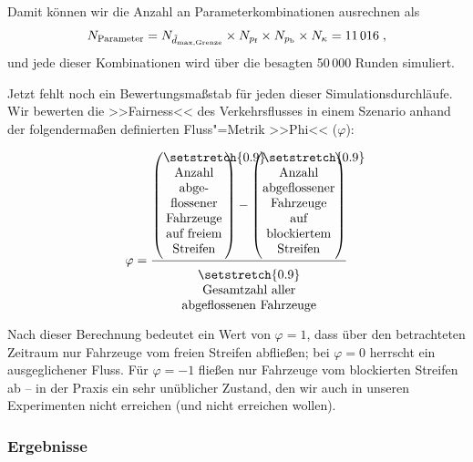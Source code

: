 Damit können wir die Anzahl an Parameterkombinationen ausrechnen als
\begin{equation}
N_{\text{Parameter}} = N_{\tilde{d}_{\text{max,Grenze}}} \times N_{p_{\text{f}}} \times N_{p_{\text{b}}} \times N_\kappa = 11\,016\;,
\end{equation}
und jede dieser Kombinationen wird über die besagten 50\,000 Runden simuliert.



Jetzt fehlt noch ein Bewertungsmaßstab für jeden dieser Simulationsdurchläufe. Wir bewerten die >>Fairness<< des Verkehrsflusses in einem Szenario anhand der folgendermaßen definierten Fluss"=Metrik >>Phi<< ($\varphi$):

\begin{equation}
\varphi = \frac{\left(\text{\parbox{1.7cm}{\centering\setstretch{0.9} Anzahl abgeflossener Fahrzeuge auf freiem Streifen\vspace{0.5em}}}\right) - \left(\text{\parbox{2cm}{\centering\setstretch{0.9} Anzahl abgeflossener Fahrzeuge auf blockiertem Streifen\vspace{0.5em}}}\right)}{\text{\parbox{4.5cm}{\vspace{0.5em}\centering\setstretch{0.9} Gesamtzahl aller abgeflossenen Fahrzeuge}}}
\end{equation}

Nach dieser Berechnung bedeutet ein Wert von $\varphi = 1$, dass über den betrachteten Zeitraum nur Fahrzeuge vom freien Streifen abfließen; bei $\varphi = 0$ herrscht ein ausgeglichener Fluss. Für $\varphi = -1$ fließen nur Fahrzeuge vom blockierten Streifen ab -- in der Praxis ein sehr unüblicher Zustand, den wir auch in unseren Experimenten nicht erreichen (und nicht erreichen wollen).


\subsubsection{Ergebnisse}


